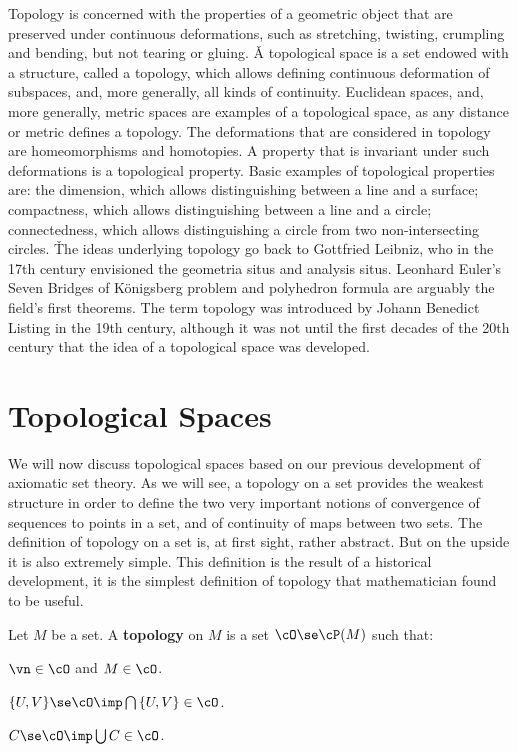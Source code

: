 Topology is concerned with the properties of a geometric object that are preserved under continuous deformations,
such as stretching, twisting, crumpling and bending, but not tearing or gluing. \v

A topological space is a set endowed with a structure, called a topology, which allows defining continuous
deformation of subspaces, and, more generally, all kinds of continuity. Euclidean spaces, and, more generally, metric
spaces are examples of a topological space, as any distance or metric defines a topology. The deformations that are
considered in topology are homeomorphisms and homotopies. A property that is invariant under such deformations is a
topological property. Basic examples of topological properties are: the dimension, which allows distinguishing
between a line and a surface; compactness, which allows distinguishing between a line and a circle; connectedness,
which allows distinguishing a circle from two non-intersecting circles. \v

The ideas underlying topology go back to Gottfried Leibniz, who in the 17th century envisioned the geometria situs
and analysis situs. Leonhard Euler's Seven Bridges of Königsberg problem and polyhedron formula are arguably the
field's first theorems. The term topology was introduced by Johann Benedict Listing in the 19th century, although it
was not until the first decades of the 20th century that the idea of a topological space was developed.

\section{Topological Spaces}

We will now discuss topological spaces based on our previous development of axiomatic set theory. As we will see, a
topology on a set provides the weakest structure in order to define the two very important notions of convergence of
sequences to points in a set, and of continuity of maps between two sets. The definition of topology on a set is, at
first sight, rather abstract. But on the upside it is also extremely simple. This definition is the result of a
historical development, it is the simplest definition of topology that mathematician found to be useful.

\bd [Topology]
Let $M$ be a set. A \textbf{topology} on $M$ is a set $\cO \se \cP(M)$ such that:
\ben
\item[i)] $\vn \in \cO$ and $M \in \cO$.
\item[ii)] $\{U,V\}\se \cO \imp \bigcap\, \{U,V\} \in \cO$.
\item[iii)] $C \se \cO \imp \bigcup C \in \cO$.
\een
\ed

